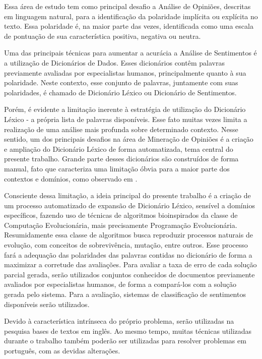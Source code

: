 \documentclass[a4paper,11pt]{article}
\begin{document}
Essa área de estudo tem como principal desafio a Análise de Opiniões, descritas em linguagem natural, para a identificação da polaridade implícita ou explícita no texto. Essa polaridade é, na maior parte das vezes, identificada como uma escala de pontuação de sua característica positiva, negativa ou neutra.

Uma das principais técnicas para aumentar a acurácia a Análise de Sentimentos é a utilização de Dicionários de Dados. Esses dicionários contêm palavras previamente avaliadas por especialistas humanos, principalmente quanto à sua polaridade. Neste contexto, esse conjunto de palavras, juntamente com suas polaridades, é chamado de Dicionário Léxico ou Dicionário de Sentimentos. 

Porém, é evidente a limitação inerente à estratégia de utilização do Dicionário Léxico - a própria lista de palavras disponíveis. Esse fato muitas vezes limita a realização de uma análise mais profunda sobre determinado contexto. Nesse sentido, um dos principais desafios na área de Mineração de Opiniões é a criação e ampliação do Dicionário Léxico de forma automatizada, tema central do presente trabalho. Grande parte desses dicionários são construídos de forma manual, fato que caracteriza uma limitação óbvia para a maior parte dos contextos e domínios, como observado em \cite{duwairi2015detecting}. 

Consciente dessa limitação, a ideia principal do presente trabalho é a criação de um processo automatizado de expansão de Dicionário Léxico, sensível a domínios específicos, fazendo uso de técnicas de algoritmos bioinspirados da classe de Computação Evolucionária, mais precisamente Programação Evolucionária. Resumidamente essa classe de algoritmos busca reproduzir processos naturais de evolução, com conceitos de sobrevivência, mutação, entre outros. Esse processo fará a adequação das polaridades das palavras contidas no dicionário de forma a maximizar a corretude das avaliações. Para avaliar a taxa de erro de cada solução parcial gerada, serão utilizados conjuntos conhecidos de documentos previamente avaliados por especialistas humanos, de forma a compará-los com a solução gerada pelo sistema. Para a avaliação, sistemas de classificação de sentimentos disponíveis serão utilizados.

Devido à característica intrínseca do próprio problema, serão utilizadas na pesquisa bases de textos em inglês. Ao mesmo tempo, muitas técnicas utilizadas durante o trabalho também poderão ser utilizadas para resolver problemas em português, com as devidas alterações. 
\end{document}
